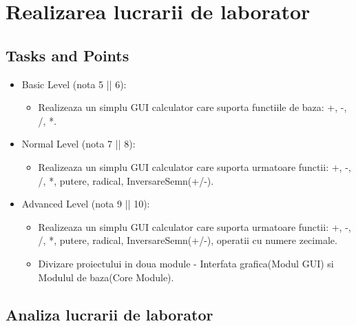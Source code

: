 \section{Realizarea lucrarii de laborator}

\subsection{Tasks and Points}
\begin{itemize}
	\item Basic Level (nota 5 || 6):
	
	\begin{itemize}
		\item Realizeaza un simplu GUI calculator care suporta functiile de baza: +, -, /, *.
	\end{itemize}
	
	\item Normal Level (nota 7 || 8):
	
	\begin{itemize}
		\item Realizeaza un simplu GUI calculator care suporta urmatoare functii: +, -, /, *, putere, radical, InversareSemn(+/-).
	\end{itemize}
	\item Advanced Level (nota 9 || 10):
	
	\begin{itemize}
		\item Realizeaza un simplu GUI calculator care suporta urmatoare functii: +, -, /, *, putere, radical, InversareSemn(+/-), operatii cu numere zecimale.
	\end{itemize}
	\begin{itemize}
		\item Divizare proiectului in doua module - Interfata grafica(Modul GUI) si Modulul de baza(Core Module).
	\end{itemize}
\end{itemize}
\subsection{Analiza lucrarii de laborator}

 
 

